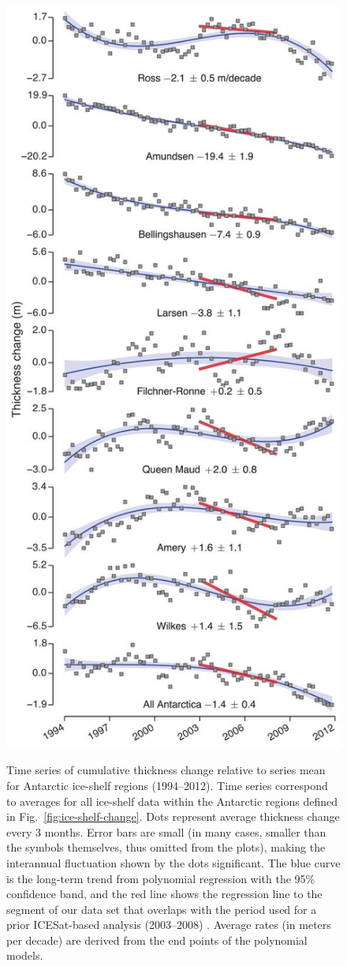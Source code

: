 \begin{figure}[!h]
  \centering
  \includegraphics[width=.63\textwidth]{img/Fig3_ts_regions_review_final.jpg}
\end{figure}
\begin{figure}
  \captionsetup{labelformat=adja-page}
  \caption[Time series of cumulative thickness change (regions)]{
Time series of cumulative thickness change relative to series mean for Antarctic ice-shelf regions (1994--2012). Time series correspond to averages for all ice-shelf data within the Antarctic regions defined in Fig.~\ref{fig:ice-shelf-change}. Dots represent average thickness change every 3 months. Error bars are small (in many cases, smaller than the symbols themselves, thus omitted from the plots), making the interannual fluctuation shown by the dots significant. The blue curve is the long-term trend from polynomial regression with the 95\% confidence band, and the red line shows the regression line to the segment of our data set that overlaps with the period used for a prior ICESat-based analysis (2003--2008) \parencite{Pritchard2012}. Average rates (in meters per decade) are derived from the end points of the polynomial models.
  \label{fig:ts-regions}
  }
\end{figure}


